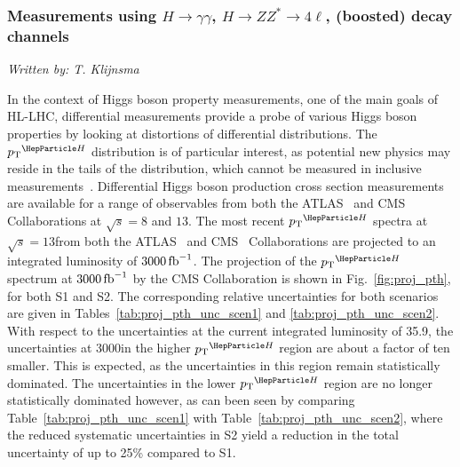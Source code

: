 \subsubsection{Measurements using $H \to \gamma\gamma$, $H \to ZZ^* \to 4\ell$, (boosted) \Hbb decay channels}
\label{sec:diffxs}

\begin{center}{\it Written by: T. Klijnsma} \end{center}



In the context of Higgs boson property measurements, one of the main goals of HL-LHC, differential measurements provide a probe of various Higgs boson properties by looking at distortions of differential distributions.
% 
The $\pTH$ distribution is of particular interest, as potential new physics may reside in the tails of the distribution, which cannot be measured in inclusive measurements~\cite{%
Khachatryan:2016vau,%
Aad:2015zhl,%
CMS:2018lkl%
}.
% 
Differential Higgs boson production cross section measurements are available for a range of observables from both the ATLAS~\cite{%
Aad:2014lwa,%
Aad:2014tca,%
Aad:2016lvc,%
Aaboud:2018xdt,%
Aaboud:2017oem,%
Aaboud:2018ezd%
} and CMS~\cite{%
Khachatryan:2015rxa,%
Khachatryan:2015yvw,%
Khachatryan:2016vnn,%
Sirunyan:2018kta,%
CMS_AN_2016-442,%
CMS-PAS-HIG-17-028%
} Collaborations at $\sqrt{s}=8$ and $13$\UTeV.
% 
The most recent $\pTH$ spectra at $\sqrt{s}=13$\UTeV from both the ATLAS~\cite{Aaboud:2018ezd} and CMS~\cite{CMS-PAS-HIG-17-028} Collaborations are projected to an integrated luminosity of $3000\mbox{\ensuremath{\,\text{fb}^\text{$-$1}}}$.
% 
The projection of the $\pTH$ spectrum at $3000\mbox{\ensuremath{\,\text{fb}^\text{$-$1}}}$ by the CMS Collaboration is shown in Fig.~\ref{fig:proj_pth}, for both S1 and S2.
% 
The corresponding relative uncertainties for both scenarios are given in Tables~\ref{tab:proj_pth_unc_scen1} and \ref{tab:proj_pth_unc_scen2}.
% 
With respect to the uncertainties at the current integrated luminosity of 35.9\fbinv, the uncertainties at 3000\fbinv in the higher $\pTH$ region are about a factor of ten smaller. This is expected, as the uncertainties in this region remain statistically dominated.
% 
The uncertainties in the lower $\pTH$ region are no longer statistically dominated however, as can been seen by comparing Table~\ref{tab:proj_pth_unc_scen1} with Table~\ref{tab:proj_pth_unc_scen2}, where the reduced systematic uncertainties in S2 yield a reduction in the total uncertainty of up to 25\% compared to S1.


